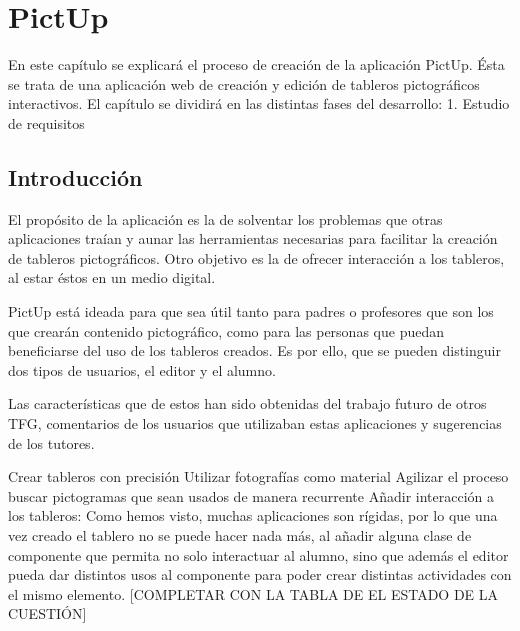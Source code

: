 \chapter{PictUp}
\label{cap:introduccion}


\begin{resumen}
	
	En este capítulo se explicará el proceso de creación de la aplicación PictUp. Ésta se trata de una aplicación web de creación y edición de tableros pictográficos interactivos. El capítulo se dividirá en las distintas fases del desarrollo: 1. Estudio de requisitos 
	
\end{resumen}

\label{cap1:sec:Motivacion}


\section{Introducción}

El propósito de la aplicación es la de solventar los problemas que otras aplicaciones traían y aunar las herramientas necesarias para facilitar la creación de tableros pictográficos. Otro objetivo es la de ofrecer interacción a los tableros, al estar éstos en un medio digital. 

PictUp está ideada para que sea útil tanto para padres o profesores que son los que crearán contenido pictográfico, como para las personas que puedan beneficiarse del uso de los tableros creados. Es por ello, que se pueden distinguir dos tipos de usuarios, el editor y el alumno. 

Las características que de estos han sido obtenidas del trabajo futuro de otros TFG, comentarios de los usuarios que utilizaban estas aplicaciones y sugerencias de los tutores.

Crear tableros con precisión
Utilizar fotografías como material
Agilizar el proceso buscar pictogramas que sean usados de manera recurrente
Añadir interacción a los tableros:
Como hemos visto, muchas aplicaciones son rígidas, por lo que una vez creado el tablero no se puede hacer nada más, al añadir alguna clase de componente que permita no solo interactuar al alumno, sino que además el editor pueda dar distintos usos al componente para poder crear distintas actividades con el mismo elemento.
[COMPLETAR CON LA TABLA DE EL ESTADO DE LA CUESTIÓN]


